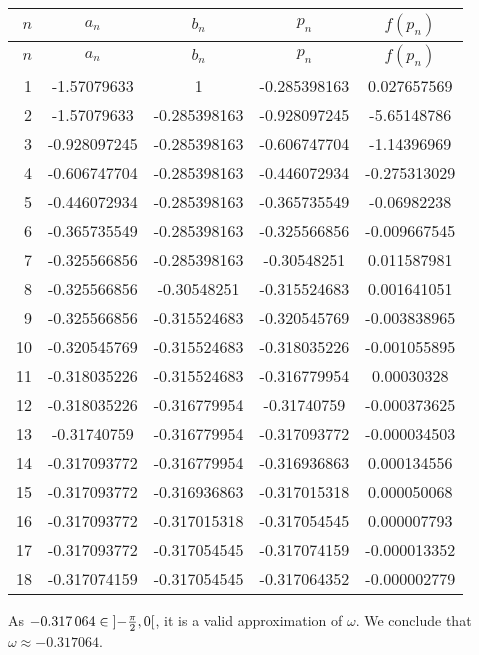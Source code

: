 \documentclass[../../../../Assignments.tex]{subfiles}
\begin{document}
\begin{solution}
    \begin{longtable}{r S[table-format=-1.9] S[table-format=-1.9] S[table-format=-1.9] S[table-format=-1.9]}
        \toprule
        \(n\)  &    {\(a_n\)}   &    {\(b_n\)}   &    {\(p_n\)}   &   {\(f(p_n)\)}  \\
        \midrule
        \endfirsthead
        \(n\)  &    {\(a_n\)}   &    {\(b_n\)}   &    {\(p_n\)}   &   {\(f(p_n)\)}  \\
        \midrule
          &  -1.57079633   &   1            &  -0.285398163  &   0.027657569   \\
            2  &  -1.57079633   &  -0.285398163  &  -0.928097245  &  -5.65148786    \\
            3  &  -0.928097245  &  -0.285398163  &  -0.606747704  &  -1.14396969    \\
            4  &  -0.606747704  &  -0.285398163  &  -0.446072934  &  -0.275313029   \\
            5  &  -0.446072934  &  -0.285398163  &  -0.365735549  &  -0.06982238    \\
            6  &  -0.365735549  &  -0.285398163  &  -0.325566856  &  -0.009667545   \\
            7  &  -0.325566856  &  -0.285398163  &  -0.30548251   &   0.011587981   \\
            8  &  -0.325566856  &  -0.30548251   &  -0.315524683  &   0.001641051   \\
            9  &  -0.325566856  &  -0.315524683  &  -0.320545769  &  -0.003838965   \\
           10  &  -0.320545769  &  -0.315524683  &  -0.318035226  &  -0.001055895   \\
           11  &  -0.318035226  &  -0.315524683  &  -0.316779954  &   0.00030328    \\
           12  &  -0.318035226  &  -0.316779954  &  -0.31740759   &  -0.000373625   \\
           13  &  -0.31740759   &  -0.316779954  &  -0.317093772  &  -0.000034503   \\
           14  &  -0.317093772  &  -0.316779954  &  -0.316936863  &   0.000134556   \\
           15  &  -0.317093772  &  -0.316936863  &  -0.317015318  &   0.000050068   \\
           16  &  -0.317093772  &  -0.317015318  &  -0.317054545  &   0.000007793   \\
           17  &  -0.317093772  &  -0.317054545  &  -0.317074159  &  -0.000013352   \\
           18  &  -0.317074159  &  -0.317054545  &  -0.317064352  &  -0.000002779   \\
        \bottomrule
    \end{longtable}

    As \(\num{-0.317064} \in \interval[open]{- \frac{\pi}{2}}{0}\), it is a
    valid approximation of \(\omega\). We conclude that \(\omega \approx
    \num{-0.317064}\).
\end{solution}
\end{document}
